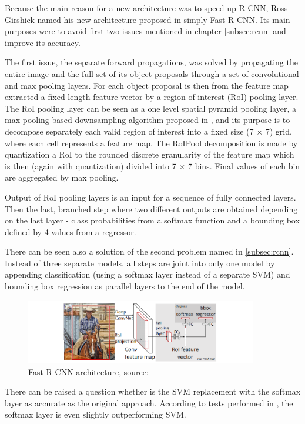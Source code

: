 \documentclass[journal, onecolumn, a4paper]{IEEEtran}
\begin{document}
Because the main reason for a new architecture was to speed-up R-CNN, Ross Girshick named his new architecture proposed in \cite{fast-rcnn} simply Fast R-CNN. Its main purposes were to avoid first two issues mentioned in chapter \ref{subsec:rcnn} and improve its accuracy. 

The first issue, the separate forward propagations, was solved by propagating the entire image and the full set of its object proposals through a set of convolutional and max pooling layers. For each object proposal is then from the feature map extracted a fixed-length feature vector by a region of interest (RoI) pooling layer. The RoI pooling layer can be seen as a one level spatial pyramid pooling layer, a max pooling based downsampling algorithm proposed in \cite{SPP}, and its purpose is to decompose separately each valid region of interest into a fixed size (7 $\times$ 7) grid, where each cell represents a feature map. The RoIPool decomposition is made by quantization a RoI to the rounded discrete granularity of the feature map which is then (again with quantization) divided into 7 $\times$ 7 bins. Final values of each bin are aggregated by max pooling. 

Output of RoI pooling layers is an input for a sequence of fully connected layers. Then the last, branched step where two different outputs are obtained depending on the last layer - class probabilities from a softmax function and a bounding box defined by 4 values from a regressor. 

There can be seen also a solution of the second problem named in \ref{subsec:rcnn}. Instead of three separate models, all steps are joint into only one model by appending classification (using a softmax layer instead of a separate SVM) and bounding box regression as parallel layers to the end of the model. 

\begin{figure}[h] \centering
	\includegraphics[width=0.9\textwidth]{fastrcnn}
	\caption{Fast R-CNN architecture, source: \cite{fast-rcnn}}
	\label{fig:fast-rcnn}
\end{figure}

There can be raised a question whether is the SVM replacement with the softmax layer as accurate as the original approach. According to tests performed in \cite{fast-rcnn}, the softmax layer is even slightly outperforming SVM. 
\end{document}
